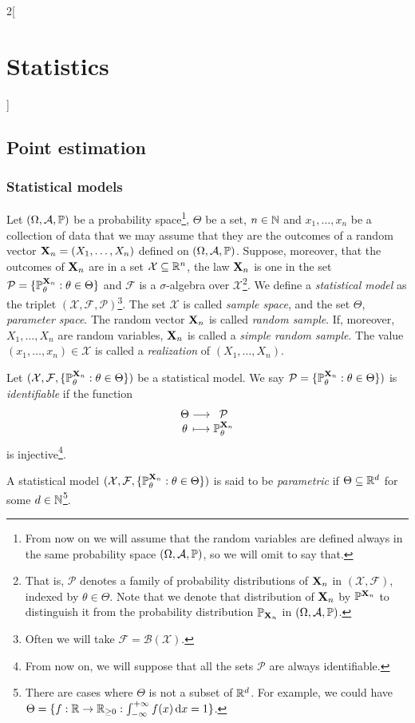 \documentclass[../../../main.tex]{subfiles}
\begin{document}
\renewcommand{\col}{\sta}
\begin{multicols}{2}[\section{Statistics}]
  \subsection{Point estimation}
  \subsubsection{Statistical models}
  \begin{definition}
    Let $(\Omega,\mathcal{A},\mathbb{P})$ be a probability space\footnote{From now on we will assume that the random variables are defined always in the same probability space $(\Omega,\mathcal{A},\mathbb{P})$, so we will omit to say that.}, $\Theta$ be a set, $n\in\mathbb{N}$ and $x_1,\ldots,x_n$ be a collection of data that we may assume that they are the outcomes of a random vector $\boldsymbol{\mathrm{X}}_n=(X_1,\ldots,X_n)$ defined on $(\Omega,\mathcal{A},\mathbb{P})$. Suppose, moreover, that the outcomes of $\boldsymbol{\mathrm{X}}_n$ are in a set $\mathcal{X}\subseteq\mathbb{R}^n$, the law $\boldsymbol{\mathrm{X}}_n$ is one in the set $\mathcal{P}=\{\mathbb{P}_\theta^{\boldsymbol{\mathrm{X}}_n}:\theta\in\Theta\}$ and $\mathcal{F}$ is a $\sigma$-algebra over $\mathcal{X}$\footnote{That is, $\mathcal{P}$ denotes a family of probability distributions of $\boldsymbol{\mathrm{X}}_n$ in $(\mathcal{X},\mathcal{F})$, indexed by $\theta\in\Theta$. Note that we denote that distribution of $\boldsymbol{\mathrm{X}}_n$ by $\mathbb{P}^{\boldsymbol{\mathrm{X}}_n}$ to distinguish it from the probability distribution $\mathbb{P}_{\boldsymbol{\mathrm{X}}_n}$ in $(\Omega,\mathcal{A},\mathbb{P})$.}. We define a \emph{statistical model} as the triplet $(\mathcal{X},\mathcal{F},\mathcal{P})$\footnote{Often we will take $\mathcal{F}=\mathcal{B}(\mathcal{X})$.}. The set $\mathcal{X}$ is called \emph{sample space}, and the set $\Theta$, \emph{parameter space}. The random vector $\boldsymbol{\mathrm{X}}_n$ is called \emph{random sample}. If, moreover, $X_1,\ldots,X_n$ are \iid random variables, $\boldsymbol{\mathrm{X}}_n$ is called a \emph{simple random sample}. The value $(x_1,\ldots,x_n)\in\mathcal{X}$ is called a \emph{realization} of $(X_1,\ldots,X_n)$.
  \end{definition}
  \begin{definition}
    Let $(\mathcal{X},\mathcal{F},\{\mathbb{P}_\theta^{\boldsymbol{\mathrm{X}}_n}:\theta\in\Theta\})$ be a statistical model. We say $\mathcal{P}=\{\mathbb{P}_\theta^{\boldsymbol{\mathrm{X}}_n}:\theta\in\Theta\})$ is \emph{identifiable} if the function $$\function{}{\Theta}{\mathcal{P}}{\theta}{\Prob_\theta^{\vf{X}_n}}$$ is injective\footnote{From now on, we will suppose that all the sets $\mathcal{P}$ are always identifiable.}.
  \end{definition}
  \begin{definition}
    A statistical model $(\mathcal{X},\mathcal{F},\{\mathbb{P}_\theta^{\boldsymbol{\mathrm{X}}_n}:\theta\in\Theta\})$ is said to be \emph{parametric} if $\Theta\subseteq \mathbb{R}^d$ for some $d\in\mathbb{N}$\footnote{There are cases where $\Theta$ is not a subset of $\mathbb{R}^d$. For example, we could have $\Theta=\{f:\mathbb{R}\rightarrow\mathbb{R}_{\geq 0} : \int_{-\infty}^{+\infty}f(x)\dd{x}=1\}$.}.
  \end{definition}

\end{multicols}
\end{document}
